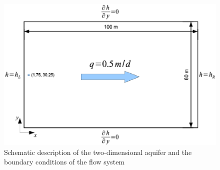 \begin{figure}[h]
\centering
\includegraphics[scale=0.45]{RWPT/figures/ModelSchematic.eps}
\caption{Schematic description of the two-dimensional aquifer and the boundary conditions of the flow system}
\label{ModelSchematic}
\end{figure}

